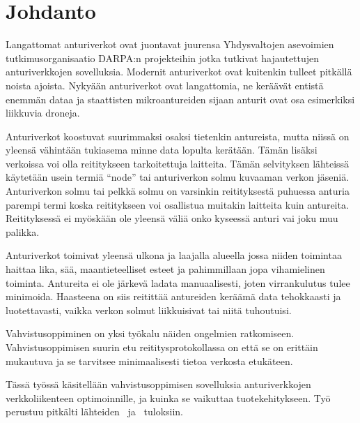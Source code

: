\section{Johdanto}
Langattomat anturiverkot ovat juontavat juurensa Yhdysvaltojen asevoimien
tutkimusorganisaatio DARPA:n projekteihin jotka tutkivat hajautettujen
anturiverkkojen sovelluksia. Modernit anturiverkot ovat kuitenkin tulleet
pitkällä noista ajoista. Nykyään anturiverkot ovat langattomia, ne keräävät
entistä enemmän dataa ja staattisten mikroantureiden sijaan anturit ovat osa
esimerkiksi liikkuvia droneja.

Anturiverkot koostuvat suurimmaksi osaksi tietenkin antureista, mutta niissä on
yleensä vähintään tukiasema minne data lopulta kerätään. Tämän lisäksi
verkoissa voi olla reititykseen tarkoitettuja laitteita.  Tämän selvityksen
lähteissä käytetään usein termiä ``node'' tai anturiverkon solmu kuvaaman
verkon jäseniä.  Anturiverkon solmu tai pelkkä solmu on varsinkin reitityksestä
puhuessa anturia parempi termi koska reititykseen voi osallistua muitakin
laitteita kuin antureita. Reitityksessä ei myöskään ole yleensä väliä onko
kyseessä anturi vai joku muu palikka.

Anturiverkot toimivat yleensä ulkona ja laajalla alueella jossa niiden
toimintaa haittaa lika, sää, maantieteelliset esteet ja pahimmillaan jopa
vihamielinen toiminta. Antureita ei ole järkevä ladata manuaalisesti, joten
virrankulutus tulee minimoida. Haasteena on siis reitittää antureiden keräämä
data tehokkaasti ja luotettavasti, vaikka verkon solmut liikkuisivat tai niitä
tuhoutuisi.

Vahvistusoppiminen on yksi työkalu näiden ongelmien ratkomiseen.
Vahvistusoppimisen suurin etu reititysprotokollassa on että se on erittäin
mukautuva ja se tarvitsee minimaalisesti tietoa verkosta etukäteen.

Tässä työssä käsitellään vahvistusoppimisen sovelluksia anturiverkkojen
verkkoliikenteen optimoinnille, ja kuinka se vaikuttaa tuotekehitykseen. Työ
perustuu pitkälti lähteiden~\cite{Arya2015} ja~\cite{Yu2006} tuloksiin.
